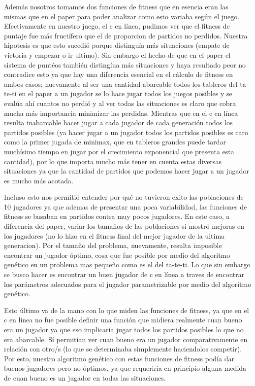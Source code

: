 \documentclass[A4paper,oneside,fleqn,11pt]{article}
\theoremstyle{definition}
\begin{document}
Además nosotros tomamos dos funciones de fitness que en esencia eran las mismas que en el paper para poder analizar como esto variaba según el juego. Efectivamente en nuestro juego, el c en línea, pudimos ver que el fitness de puntaje fue más fructífero que el de proporcion de partidos no perdidos. Nuestra hipotesis es que esto sucedió porque distinguía más situaciones (empate de victoria y empezar o ir ultimo). Sin embargo el hecho de que en el paper el sistema de puntéos también distingíua más situaciones y haya resultado peor no contradice esto ya que hay una diferencia esencial en el cálculo de fitness en ambos casos: nuevamente al ser una cantidad abarcable todos los tableros del ta-te-ti en el paper a un jugador se lo hace jugar todos los juegos posibles y se evalúa ahí cuantos no perdió y al ver todas las situaciones es claro que cobra mucha más importancia minimizar las perdidas. Mientras que en el c en línea resulta inabarcable hacer jugar a cada jugador de cada generación todos los partidos posibles (ya hacer jugar a un jugador todos los partidos posibles es caro como la primer jugada de minimax, que en tableros grandes puede tardar muchísimo tiempo en jugar por el crecimiento exponencial que presenta esta cantidad), por lo que importa mucho más tener en cuenta estas diversas situaciones ya que la cantidad de partidos que podemos hacer jugar a un jugador es mucho más acotada.

Incluso esto nos permitió entender por qué no tuvieron exito las poblaciones de 10 jugadores ya que ademas de presentar una poca variabilidad, las funciones de fitness se basaban en partidos contra muy pocos jugadores. En este caso, a diferencia del paper, variar los tamaños de las poblaciones si mostró mejoras en los jugadores (no lo hizo en el fitness final del mejor jugador de la ultima generacion). Por el tamaño del problema, nuevamente, resulta imposible encontrar un jugador óptimo, cosa que fue posible por medio del algoritmo genético en un problema mas pequeño como es el del ta-te-ti. Lo que sin embargo se busco hacer es encontrar un buen jugador de c en línea a traves de encontrar los parámetros adecuados para el jugador parametrizable por medio del algoritmo genético.

Esto último va de la mano con lo que miden las funciones de fitness, ya que en el c en línea no fue posible definir una función que midiera realmente cuan bueno era un jugador ya que eso implicaría jugar todos los partidos posibles lo que no era abarcable. Sí permitían ver cuan bueno era un jugador comparativamente en relación con otro/s (lo que se determinaba simplemente haciendolos competir). Por esto, nuestro algoritmo genético con estas funciones de fitness podía dar buenos jugadores pero no óptimos, ya que requeriría en principio alguna medida de cuan bueno es un jugador en todas las situaciones.
\end{document}
